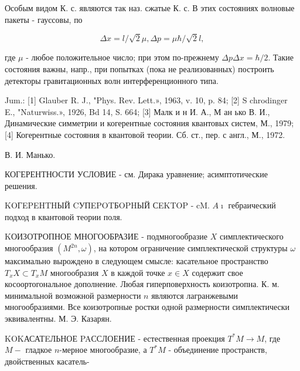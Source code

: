 \documentclass[10pt]{article}
\begin{document}
Особым видом К. с. являются так наз. сжатые К. с. В этих состояниях волновые пакеты - гауссовы, по



\[

\Delta x=l / \sqrt{2} \mu, \Delta p=\mu \hbar / \sqrt{2} l,

\]



где $\mu$ - любое положительное число; при этом по-прежнему $\Delta p \Delta x=\hbar / 2$. Такие состояния важны, напр., при попытках (пока не реализованных) построить детекторы гравитационных волн интерференционного типа.



Jum.: [1] Glauber R. J., "Phys. Rev. Lett.», 1963, v. 10, p. 84; [2] S chrodinger E., "Naturwiss.», 1926, Bd 14, S. 664; [3] Малк и н И. А., М ан ько В. И., Динамические симметрии и когерентные состояния квантовых систем, М., 1979; [4] Когерентные состояния в квантовой теории. Сб. ст., пер. с англ., М., 1972.



В. И. Манько.



КОГЕРЕНТНОСТИ УСЛОВИЕ - см. Дирака уравнение; асимптотические решения.



KOГEPEHTHЫЙ CУПEPOTБOPHЫЙ СEKTOP - cM. $A \imath$ гебраический подход в квантовой теории поля.



KОИЗОТРОПНОЕ МНОГООБРАЗИЕ - подмногообразие $X$ симплектического многообразия $\left(M^{2 n}, \omega\right)$, на котором ограничение симплектической структуры $\omega$ максимально вырождено в следующем смысле: касательное пространство $T_{x} X \subset T_{x} M$ многообразия $X$ в каждой точке $x \in X$ содержит свое косоортогональное дополнение. Любая гиперповерхность коизотропна. К. м. минимальной возможной размерности $n$ являются лагранжевыми многообразиями. Все коизотропные ростки одной размерности симплектически эквивалентны. М. Э. Казарян.



KOKАСАТEЛЬНОЕ PAССЛОЕНИЕ - естественная проекция $T^{*} M \rightarrow M$, где $M-$ гладкое $n$-мерное многообразие, а $T^{*} M$ - объединение пространств, двойственных касатель-
\end{document}
